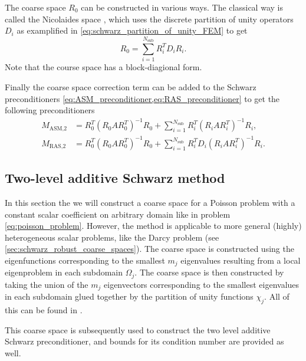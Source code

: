 The coarse space $R_0$ can be constructed in various ways. The classical way is called the Nicolaides space \cite[Section 4.2]{schwarz_methods_Dolean_2015}, which uses the discrete partition of unity operators $D_i$ as examplified in \cref{eq:schwarz_partition_of_unity_FEM} to get
\begin{equation}
    R_0 = \sum_{i=1}^{N_{\text{sub}}} R_i^T D_i R_i.
    \label{eq:schwarz_nicolaides_coarse_space}
\end{equation}
Note that the course space has a block-diagional form.

Finally the coarse space correction term can be added to the Schwarz preconditioners \cref{eq:ASM_preconditioner,eq:RAS_preconditioner} to get the following preconditioners
\begin{subequations}
    \begin{align}
        M_{\text{ASM,2}} & = R_0^T (R_0 A R_0^T)^{-1} R_0 + \sum_{i=1}^{N_{\text{sub}}} R_i^T (R_i A R_i^T)^{-1} R_i , \label{eq:ASM_preconditioner_coarse}    \\
        M_{\text{RAS,2}} & = R_0^T (R_0 A R_0^T)^{-1} R_0 + \sum_{i=1}^{N_{\text{sub}}} R_i^T D_i (R_i A R_i^T)^{-1} R_i \label{eq:RAS_preconditioner_coarse}.
    \end{align}
\end{subequations}

\subsection{Two-level additive Schwarz method}
In this section the we will construct a coarse space for a Poisson problem with a constant scalar coefficient on arbitrary domain like in problem \ref{eq:poisson_problem}. However, the method is applicable to more general (highly) heterogeneous scalar problems, like the Darcy problem (see \cref{sec:schwarz_robust_coarse_spaces}). The coarse space is constructed using the eigenfunctions corresponding to the smallest $m_j$ eigenvalues resulting from a local eigenproblem in each subdomain $\Omega_j$. The coarse space is then constructed by taking the union of the $m_j$ eigenvectors corresponding to the smallest eigenvalues in each subdomain glued together by the partition of unity functions $\chi_j$. All of this can be found in \cite[Sections 5.1-5.5]{schwarz_methods_Dolean_2015}.

This coarse space is subsequently used to construct the two level additive Schwarz preconditioner, and bounds for its condition number are provided as well.

